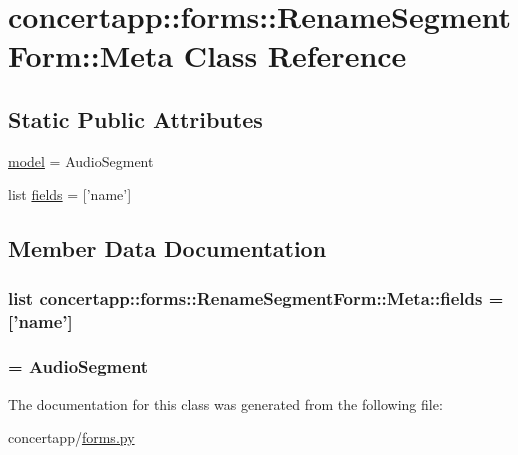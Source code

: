 \hypertarget{classconcertapp_1_1forms_1_1_rename_segment_form_1_1_meta}{
\section{concertapp::forms::RenameSegmentForm::Meta Class Reference}
\label{classconcertapp_1_1forms_1_1_rename_segment_form_1_1_meta}
}
\subsection*{Static Public Attributes}
\begin{DoxyCompactItemize}
\item 
\hyperlink{classconcertapp_1_1forms_1_1_rename_segment_form_1_1_meta_a28def3ba18fe2e5a1c5ea88e133e5bf4}{model} = AudioSegment
\item 
list \hyperlink{classconcertapp_1_1forms_1_1_rename_segment_form_1_1_meta_a71aa983e06b8a2c434cefec0f7446a5c}{fields} = \mbox{[}'name'\mbox{]}
\end{DoxyCompactItemize}


\subsection{Member Data Documentation}
\hypertarget{classconcertapp_1_1forms_1_1_rename_segment_form_1_1_meta_a71aa983e06b8a2c434cefec0f7446a5c}{
\subsubsection[{fields}]{\setlength{\rightskip}{0pt plus 5cm}list {\bf concertapp::forms::RenameSegmentForm::Meta::fields} = \mbox{[}'name'\mbox{]}}}
\label{classconcertapp_1_1forms_1_1_rename_segment_form_1_1_meta_a71aa983e06b8a2c434cefec0f7446a5c}
\hypertarget{classconcertapp_1_1forms_1_1_rename_segment_form_1_1_meta_a28def3ba18fe2e5a1c5ea88e133e5bf4}{
\subsubsection[{model}]{ = AudioSegment}}
\label{classconcertapp_1_1forms_1_1_rename_segment_form_1_1_meta_a28def3ba18fe2e5a1c5ea88e133e5bf4}


The documentation for this class was generated from the following file:\begin{DoxyCompactItemize}
\item 
concertapp/\hyperlink{forms_8py}{forms.py}\end{DoxyCompactItemize}
